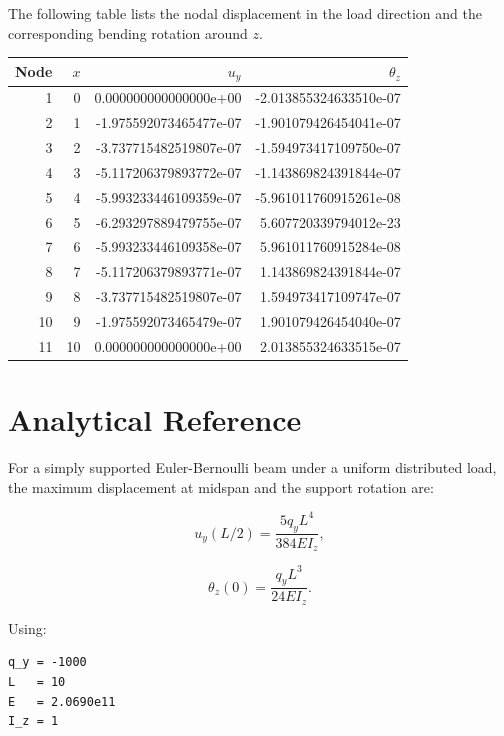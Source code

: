 \documentclass[11pt]{article}
\begin{document}
The following table lists the nodal displacement in the load direction and the
corresponding bending rotation around $z$.

\begin{center}
\begin{tabular}{rrrr}
\toprule
Node & $x$ & $u_y$ & $\theta_z$ \\
\midrule
1  & 0  &  0.000000000000000e+00 & -2.013855324633510e-07 \\
2  & 1  & -1.975592073465477e-07 & -1.901079426454041e-07 \\
3  & 2  & -3.737715482519807e-07 & -1.594973417109750e-07 \\
4  & 3  & -5.117206379893772e-07 & -1.143869824391844e-07 \\
5  & 4  & -5.993233446109359e-07 & -5.961011760915261e-08 \\
6  & 5  & -6.293297889479755e-07 &  5.607720339794012e-23 \\
7  & 6  & -5.993233446109358e-07 &  5.961011760915284e-08 \\
8  & 7  & -5.117206379893771e-07 &  1.143869824391844e-07 \\
9  & 8  & -3.737715482519807e-07 &  1.594973417109747e-07 \\
10 & 9  & -1.975592073465479e-07 &  1.901079426454040e-07 \\
11 & 10 &  0.000000000000000e+00 &  2.013855324633515e-07 \\
\bottomrule
\end{tabular}
\end{center}

\section{Analytical Reference}

For a simply supported Euler-Bernoulli beam under a uniform distributed load,
the maximum displacement at midspan and the support rotation are:

\begin{equation}
u_y(L/2) = \frac{5q_yL^4}{384EI_z},
\end{equation}

\begin{equation}
\theta_z(0) = \frac{q_yL^3}{24EI_z}.
\end{equation}

Using:

\begin{lstlisting}
q_y = -1000
L   = 10
E   = 2.0690e11
I_z = 1
\end{lstlisting}
\end{document}
